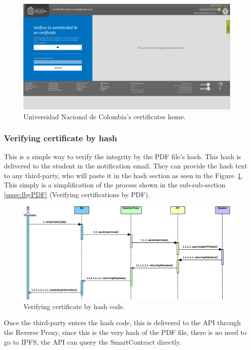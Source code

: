 \documentclass[runningheads]{llncs}
\begin{document}
\begin{figure}
\includegraphics[width=\textwidth]{08-home.png}
\caption{Universidad Nacional de Colombia's certificates home.}
\label{fig8}
\end{figure}

\subsubsection{Verifying certificate by hash}
This is a simple way to verify the integrity by the PDF file's hash. This hash is delivered to the student in the notification email. They can provide the hash text to any third-party, who will paste it in the hash section as seen in the Figure~\ref{fig8}. This simply is a simplification of the process shown in the sub-sub-section \ref{sssec:lbyPDF} (Verifying certifications by PDF).

\begin{figure}
\includegraphics[width=\textwidth]{09-verifying-by-hash.eps}
\caption{Verifying certificate by hash code.}
\label{fig9}
\end{figure}

Once the third-party enters the hash code, this is delivered to the API through the Reverse Proxy, since this is the very hash of the PDF file, there is no need to go to IPFS, the API can query the SmartContract directly.
\end{document}
